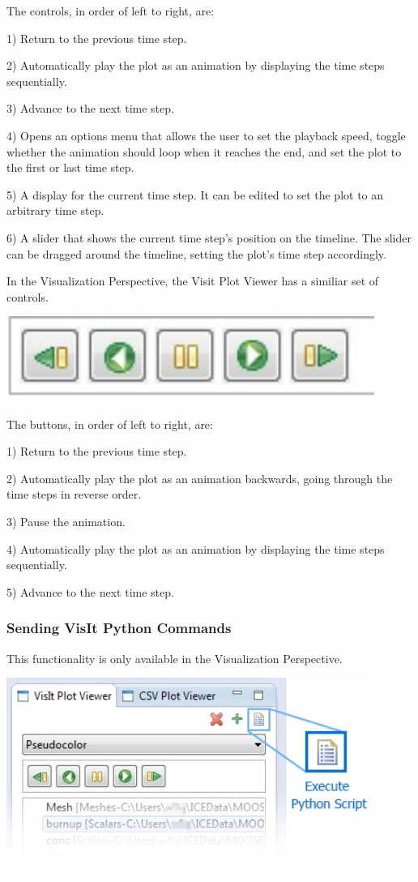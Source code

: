 \documentclass{article}
\begin{document}
The controls, in order of left to right, are:

1) Return to the previous time step.

2) Automatically play the plot as an animation by displaying the time steps
sequentially. 

3) Advance to the next time step. 

4) Opens an options menu that allows the user to set the playback speed, toggle
whether the animation should loop when it reaches the end, and set the plot to
the first or last time step.

5) A display for the current time step. It can be edited to set the plot to an
arbitrary time step. 

6) A slider that shows the current time step's position on the timeline. The
slider can be dragged around the timeline, setting the plot's time step
accordingly.

In the Visualization Perspective, the Visit Plot Viewer has a similiar set of
controls.

\begin{center}
\includegraphics[width=12cm]{images/VizPerspectiveTimeControls}
\end{center}

The buttons, in order of left to right, are:

1) Return to the previous time step.

2) Automatically play the plot as an animation backwards, going through the time
steps in reverse order.

3) Pause the animation.

4) Automatically play the plot as an animation by displaying the time steps
sequentially.

5) Advance to the next time step. 

\subsubsection{Sending VisIt Python Commands}

This functionality is only available in the Visualization Perspective.

\begin{center}
\includegraphics[width=12cm]{images/PythonScriptButton}
\end{center}
\end{document}
